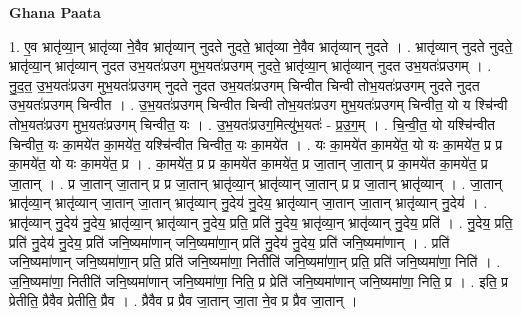 \documentclass[17pt]{extarticle}
\begin{document}
\textbf{Ghana Paata } \newline

1. ए॒व भ्रातृ॑व्या॒न् भ्रातृ॑व्या ने॒वैव भ्रातृ॑व्यान् नुदते नुदते॒ भ्रातृ॑व्या ने॒वैव भ्रातृ॑व्यान् नुदते । . भ्रातृ॑व्यान् नुदते नुदते॒ भ्रातृ॑व्या॒न् भ्रातृ॑व्यान् नुदत उभ॒यतः॑प्र‌उग मुभ॒यतः॑प्र‌उगम् नुदते॒ भ्रातृ॑व्या॒न् भ्रातृ॑व्यान् नुदत उभ॒यतः॑प्र‌उगम् । . नु॒द॒त॒ उ॒भ॒यतः॑प्र‌उग मुभ॒यतः॑प्र‌उगम् नुदते नुदत उभ॒यतः॑प्र‌उगम् चिन्वीत चिन्वी तोभ॒यतः॑प्र‌उगम् नुदते नुदत उभ॒यतः॑प्र‌उगम् चिन्वीत । . उ॒भ॒यतः॑प्र‌उगम् चिन्वीत चिन्वी तोभ॒यतः॑प्र‌उग मुभ॒यतः॑प्र‌उगम् चिन्वीत॒ यो य श्चि॑न्वी तोभ॒यतः॑प्र‌उग मुभ॒यतः॑प्र‌उगम् चिन्वीत॒ यः । . उ॒भ॒यतः॑प्र‌उग॒मित्यु॑भ॒यतः॑ - प्र॒उ॒ग॒म् । . चि॒न्वी॒त॒ यो यश्चि॑न्वीत चिन्वीत॒ यः का॒मये॑त का॒मये॑त॒ यश्चि॑न्वीत चिन्वीत॒ यः का॒मये॑त । . यः का॒मये॑त का॒मये॑त॒ यो यः का॒मये॑त॒ प्र प्र का॒मये॑त॒ यो यः का॒मये॑त॒ प्र । . का॒मये॑त॒ प्र प्र का॒मये॑त का॒मये॑त॒ प्र जा॒तान् जा॒तान् प्र का॒मये॑त का॒मये॑त॒ प्र जा॒तान् । . प्र जा॒तान् जा॒तान् प्र प्र जा॒तान् भ्रातृ॑व्या॒न् भ्रातृ॑व्यान् जा॒तान् प्र प्र जा॒तान् भ्रातृ॑व्यान् । . जा॒तान् भ्रातृ॑व्या॒न् भ्रातृ॑व्यान् जा॒तान् जा॒तान् भ्रातृ॑व्यान् नु॒देय॑ नु॒देय॒ भ्रातृ॑व्यान् जा॒तान् जा॒तान् भ्रातृ॑व्यान् नु॒देय॑ । . भ्रातृ॑व्यान् नु॒देय॑ नु॒देय॒ भ्रातृ॑व्या॒न् भ्रातृ॑व्यान् नु॒देय॒ प्रति॒ प्रति॑ नु॒देय॒ भ्रातृ॑व्या॒न् भ्रातृ॑व्यान् नु॒देय॒ प्रति॑ । . नु॒देय॒ प्रति॒ प्रति॑ नु॒देय॑ नु॒देय॒ प्रति॑ जनि॒ष्यमा॑णान् जनि॒ष्यमा॑णा॒न् प्रति॑ नु॒देय॑ नु॒देय॒ प्रति॑ जनि॒ष्यमा॑णान् । . प्रति॑ जनि॒ष्यमा॑णान् जनि॒ष्यमा॑णा॒न् प्रति॒ प्रति॑ जनि॒ष्यमा॑णा॒ नितीति॑ जनि॒ष्यमा॑णा॒न् प्रति॒ प्रति॑ जनि॒ष्यमा॑णा॒ निति॑ । . ज॒नि॒ष्यमा॑णा॒ नितीति॑ जनि॒ष्यमा॑णान् जनि॒ष्यमा॑णा॒ निति॒ प्र प्रेति॑ जनि॒ष्यमा॑णान् जनि॒ष्यमा॑णा॒ निति॒ प्र । . इति॒ प्र प्रेतीति॒ प्रैवैव प्रेतीति॒ प्रैव । . प्रैवैव प्र प्रैव जा॒तान् जा॒ता ने॒व प्र प्रैव जा॒तान् । \newline
\end{document}
